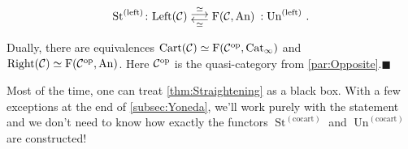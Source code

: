 \begin{thm}
\begin{alphanumerate}
		\begin{equation*}
			\operatorname{St}^{(\mathrm{left})}\colon \cat{Left}(\Cc) \underset{\simeq}{\mathrel{\smash{\underset{\smash{\raisebox{0.35em}{$\longleftarrow$}}}{\overset{\smash{\raisebox{-0.35em}{$\overset{\simeq}{\longrightarrow}$}}}{\phantom{\longrightarrow}}}}}}\F\!\left(\Cc,\cat{An}\right)\noloc \operatorname{Un}^{(\mathrm{left})}\vphantom{\overset{\simeq}{\overline{x}}}\,.
		\end{equation*}
	\end{alphanumerate}
	Dually, there are equivalences $\mathrm{Cart}(\mathcal{C})\simeq \operatorname{F}(\mathcal{C}^{\mathrm{op}},\mathrm{Cat}_\infty)$ and $\mathrm{Right}(\mathcal{C})\simeq \operatorname{F}(\mathcal{C}^{\mathrm{op}},\mathrm{An})$. Here $\mathcal{C}^{\mathrm{op}}$ is the quasi-category from \cref{par:Opposite}.\hfill$\blacksquare$
\end{thm}
Most of the time, one can treat \cref{thm:Straightening} as a black box. With a few exceptions at the end of \cref{subsec:Yoneda}, we'll work purely with the statement and we don't need to know how exactly the functors $\operatorname{St}^{(\mathrm{cocart})}$ and $\operatorname{Un}^{(\mathrm{cocart})}$ are constructed!

